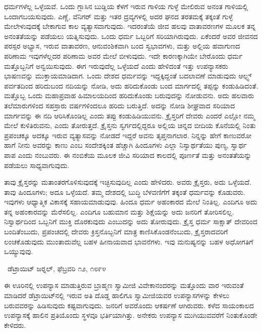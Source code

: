  ಧರ್ಮಗಳೆಲ್ಲ ಒಳ್ಳೆಯವೆ. ಒಂದು ಗ್ಲಾಸಿನ ಬುಡ್ಡಿಯ ಕೆಳಗೆ ಇರುವ ಗಾಳಿಯ ಗುಳ್ಳೆ ಮೇಲಿರುವ ಅನಂತ ಗಾಳಿಯಲ್ಲಿ ಒಂದಾಗಬಯಸುವುದು. ಎಣ್ಣೆ, ವೆನಿಗರ್ ಮತ್ತು ಇತರ ದ್ರವ್ಯಗಳಲ್ಲಿ ಅದರ ಘನದ ತರತಮಕ್ಕೆ ತಕ್ಕಂತೆ ಗುಳ್ಳೆ ಮೇಲೇಳುವುದಕ್ಕೆ ಬೇಕಾಗುವ ಕಾಲ ವ್ಯತ್ಯಾಸವಾಗುವುದು. ಇದರಂತೆಯೆ ಜೀವ ಹಲವು ವಾತಾವರಣಗಳ ಮೂಲಕ ತನ್ನ ಅನಂತತೆಯನ್ನು ಪಡೆಯಲು ಯತ್ನಿಸುವುದು. ಒಂದು ಧರ್ಮ ಒಬ್ಬರಿಗೆ ಸರಿಯಾಗಿರುವುದು. ಏಕೆಂದರೆ ಅವರ ಜೀವನದ ಪರಸ್ಪರ ಅಭ್ಯಾಸ, ಇರುವ ವಾತಾವರಣ, ಆನುವಂಶಿಕವಾಗಿ ಬಂದ ಸ್ವಭಾವಗಳು, ಮತ್ತು ಅಲ್ಲಿಯ ಹವಾಗುಣದ ಪರಿಣಾಮ ಇವುಗಳೆಲ್ಲದರ ಪರಿಣಾಮ ಅವರ ಮೇಲೆ ಬೀಳುವುದು. ಇದೇ ಕಾರಣಕ್ಕಾಗಿಯೇ ಬೇರೊಂದು ಧರ್ಮ ಮತ್ತೊಬ್ಬನಿಗೆ ಅನ್ವಯಿಸುವುದು. ಈಗ ಇರುವುದೆಲ್ಲ ಒಳ್ಳೆಯದೆ ಎಂದು ಹೇಳಿದಂತೆ ಇತ್ತು ಉಪನ್ಯಾಸಕರು ಭಾಷಣವನ್ನು ಮುಕ್ತಾಯಮಾಡಿದಾಗ. ಒಂದು ದೇಶದ ಧರ್ಮವನ್ನು ಇದ್ದಕ್ಕಿದ್ದಂತೆ ಬದಲಾವಣೆ ಮಾಡುವುದು ಆಲ್ಫ್ಸ್ ಪರ್ವತದಿಂದ ಹರಿದುಬಂದ ನದಿಯನ್ನು ನೋಡಿ, ಅದು ಹರಿದುಕೊಂಡು ಬಂದ ಮಾರ್ಗದಲ್ಲಿ ತಪ್ಪನ್ನು ಕಂಡುಹಿಡಿದಂತೆ. ಮತ್ತೊಬ್ಬ ಒಂದು ಮಹಾಪ್ರವಾಹ ಹಿಮಾಲಯದಿಂದ ಹರಿದುಕೊಂಡು ಬರುವುದನ್ನು ನೋಡುವನು. ಅದು ಹಲವಾರು ತಲೆಮಾರುಗಳಿಂದ ಸಹಸ್ರಾರು ವರ್ಷಗಳಿಂದಲೂ ಹರಿದು ಬರುತ್ತಿದೆ. ಅದನ್ನು ನೋಡಿ ಶೀಘ್ರವಾದ ಸರಿಯಾದ ಮಾರ್ಗವನ್ನು ಈ ನದಿ ಆರಿಸಿಕೊಂಡಿಲ್ಲ ಎಂದು ತಪ್ಪು ಕಂಡುಹಿಡಿಯುವನು. ಕ್ರೈಸ್ತರಿಗೆ ದೇವರು ಎಂದರೆ ಎಲ್ಲೋ ನಮ್ಮ ಮೇಲೆ ಕುಳಿತಿರುವನು, ಎಂದು ತೋರುತ್ತದೆ. ಕ್ರೈಸ್ತನು ಸ್ವರ್ಗದಲ್ಲಿದ್ದರೂ ಅಲ್ಲಿಯ ಚಿನ್ನದ ಬೀದಿಯ ಕೊನೆಯಲ್ಲಿ ನಿಂತು ಪ್ರಪಂಚಕ್ಕೂ ಅದಕ್ಕೂ ಇರುವ ವ್ಯತ್ಯಾಸವನ್ನು ನೋಡದೆ ಇದ್ದರೆ ಅವನು ತೃಪ್ತನಾಗಲಾರ. ನಿನ್ನನ್ನು ಹೇಗೆ ಕಾಣುವರೋ ಹಾಗೆ ನೀನು ಅವರನ್ನು ಕಾಣು ಎಂಬ ಸಂದೇಶಕ್ಕಿಂತ ಹೆಚ್ಚಾಗಿ ಹಿಂದೂಗಳು ಎಲ್ಲಾ ನಿಸ್ವಾರ್ಥತೆಯು ಪುಣ್ಯ, ಸ್ವಾರ್ಥ ಪಾಪ ಎಂದು ನಂಬುವರು. ಈ ನಂಬಿಕೆಯ ಮೂಲಕ ಜೀವಿ ಸರಿಯಾದ ಕಾಲದಲ್ಲಿ ಪೂರ್ಣತೆ ಮತ್ತು ಅನಂತತೆಯನ್ನು ಪಡೆಯಲು ಸಾಧ್ಯವಾಗುವುದು. 

 ತಾವು ಕ್ರೈಸ್ತರನ್ನು ಮತಾಂತರಗೊಳಿಸುವುದಕ್ಕೆ ಇಚ್ಛಿಸುವುದಿಲ್ಲ ಎಂದು ಹೇಳಿದರು. ಅವರು ಕ್ರೈಸ್ತರು, ಅದು ಒಳ್ಳೆಯದೆ. ತಾವು ಹಿಂದೂಗಳು; ಅದೂ ಒಳ್ಳೆಯದೆ. ತಮ್ಮ ದೇಶದಲ್ಲಿ ಬುದ್ಧಿ ಬೆಳವಣಿಗೆಗೆ ತಕ್ಕಂತೆ ಧರ್ಮವನ್ನು ಕೊಡುವರು. ಇವುಗಳು ಆಧ್ಯಾತ್ಮಿಕ ವಿಕಾಸಕ್ಕೆ ಸಹಾಯಮಾಡುವುವು. ಹಿಂದೂ ಧರ್ಮ ಅಹಂಕಾರದ ಮೇಲೆ ನಿಂತಿಲ್ಲ. ಎಂದಿಗೂ ಅದು ತನ್ನ ಅಹಂಕಾರವನ್ನು ಮೆರೆಸಲಿಲ್ಲ. ಎಂದಿಗೂ ಬಹುಮಾನ ಮತ್ತು ಶಿಕ್ಷೆಯನ್ನು ಅದು ಜನರಿಗೆ ತೋರಿಸಲಿಲ್ಲ. ನಿಸ್ವಾರ್ಥದಿಂದ ಒಬ್ಬನಿಗೆ ಮುಕ್ತಿ ದೊರಕುವುದು ಎಂಬುದನ್ನು ಅದು ತೋರುವುದು. ಕ್ರೈಸ್ತ ಧರ್ಮ ಸಾಕ್ಷಾತ್ ದೇವರಿಂದ ಬಂದಿತೆಂಬುದು, ಪ್ರಪಂಚದಲ್ಲಿ ದೇವರು ಕ್ರಿಸ್ತನೊಬ್ಬನಿಗೆ ಮಾತ್ರ ಕಾಣಿಸಿಕೊಂಡನೆಂಬುದು, ಕ್ರೈಸ್ತರಾದವರಿಗೆ ಲಂಚಕೊಡುವುದು ಮುಂತಾದುವೆಲ್ಲ ಬಹಳ ಹೀನಾಯವಾದ ಭಾವನೆಗಳು. ಇವು ಮನುಷ್ಯನನ್ನು ಬಹಳ ಅಧೋಗತಿಗೆ ಒಯ್ಯುವುವು.

~\hfill{\fontsize{11pt}{13.75pt}\selectfont ಡೆಟ್ರಾಯಿಟ್ ಜರ‍್ನಲ್, ಫೆಬ್ರವರಿ ೧೨, ೧೮೯೪}

 ಈ ಊರಿನಲ್ಲಿ ಉಪನ್ಯಾಸ ಮಾಡುತ್ತಿರುವ ಬ್ರಾಹ್ಮಣ ಸ್ವಾಮೀಜಿ ವಿವೇಕಾನಂದರನ್ನು ಮತ್ತೊಂದು ವಾರ ಇರುವಂತೆ ಮಾಡಿದರೆ ಡೆಟ್ರಾಯಿಟ್‍ನಲ್ಲಿ ಇರುವ ಅತಿ ದೊಡ್ಡ ಹಾಲಿಗೂ ಸ್ವಾಮೀಜಿಯವರ ಉಪನ್ಯಾಸಗಳನ್ನು ಕೇಳಲು ಬರುವವರನ್ನು ಹಿಡಿಸುವುದು ಕಷ್ಟವಾಗುವುದು. ಜನರಿಗೆ ಅವರೊಂದು ಆಕರ್ಷಣೆ ಆಗಿರುವರು. ಕಳೆದ ಸಾಯಂಕಾಲದ ಉಪನ್ಯಾಸಕ್ಕೆ ಹಾಲಿನ ಪ್ರತಿಯೊಂದು ಸ್ಥಳವೂ ಭರ್ತಿಯಾಗಿತ್ತು. ಅನೇಕರು ಉಪನ್ಯಾಸ ಮುಗಿಯುವವರೆಗೆ ನಿಂತುಕೊಂಡೇ ಕೇಳಿದರು. 

